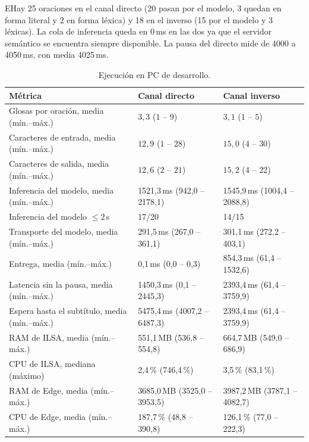 EHay 25 oraciones en el canal directo (20 pasan por el modelo, 3 quedan en forma literal y 2 en forma léxica) y 18 en el inverso (15 por el modelo y 3 léxicas). La cola de inferencia queda en 0\,ms en las dos ya que el servidor semántico se encuentra siempre disponible. La pausa del directo mide de 4000 a 4050\,ms, con media 4025\,ms.

\begin{table}[H]
\centering
\footnotesize
\setlength{\tabcolsep}{3pt}
\caption{Ejecución en PC de desarrollo.}
\label{tab:telemetria_pc}
\begin{tabularx}{\textwidth}{@{}>{\raggedright\arraybackslash}p{4.8cm} X X@{}}
\toprule
\textbf{Métrica} & \textbf{Canal directo} & \textbf{Canal inverso} \\
\midrule
Glosas por oración, media (mín.--máx.) & $3{,}3$ ($1$ -- $9$) & $3{,}1$ ($1$ -- $5$) \\
Caracteres de entrada, media (mín.--máx.) & $12{,}9$ ($1$ -- $28$) & $15{,}0$ ($4$ -- $30$) \\
Caracteres de salida, media (mín.--máx.) & $12{,}6$ ($2$ -- $21$) & $15{,}2$ ($4$ -- $22$) \\
Inferencia del modelo, media (mín.--máx.) & 1521{,}3\,ms (942{,}0 -- 2178{,}1) & 1545{,}9\,ms (1004{,}4 -- 2088{,}8) \\
Inferencia del modelo $\le 2$\,s & 17/20 & 14/15 \\
Transporte del modelo, media (mín.--máx.) & 291{,}5\,ms (267{,}0 -- 361{,}1) & 301{,}1\,ms (272{,}2 -- 403{,}1) \\
Entrega, media (mín.--máx.) & 0{,}1\,ms (0{,}0 -- 0{,}3) & 854{,}3\,ms (61{,}4 -- 1532{,}6) \\
Latencia sin la pausa, media (mín.--máx.) & 1450{,}3\,ms (0{,}1 -- 2445{,}3) & 2393{,}4\,ms (61{,}4 -- 3759{,}9) \\
Espera hasta el subtítulo, media (mín.--máx.) & 5475{,}4\,ms (4007{,}2 -- 6487{,}3) & 2393{,}4\,ms (61{,}4 -- 3759{,}9) \\
RAM de ILSA, media (mín.--máx.) & 551{,}1\,MB (536{,}8 -- 554{,}8) & 664{,}7\,MB (549{,}0 -- 686{,}9) \\
CPU de ILSA, mediana (máximo) & 2{,}4\,\% (746{,}4\,\%) & 3{,}5\,\% (83{,}1\,\%) \\
RAM de Edge, media (mín.--máx.) & 3685{,}0\,MB (3525{,}0 -- 3953{,}5) & 3987{,}2\,MB (3787{,}1 -- 4082{,}7) \\
CPU de Edge, media (mín.--máx.) & 187{,}7\,\% (48{,}8 -- 390{,}8) & 126{,}1\,\% (77{,}0 -- 222{,}3) \\

\end{tabularx}
\end{table}
